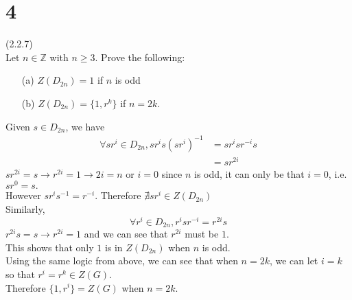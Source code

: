 \documentclass{article}
\begin{document}
\section*{4}
(2.2.7)\\
Let $n \in \mathbb{Z}$ with $n \geq 3$. Prove the following:
\begin{itemize}
    \item[(a)] $Z(D_{2n}) = 1$ if $n$ is odd
    \item[(b)] $Z(D_{2n}) = \{1, r^k\}$ if $n = 2k$.
\end{itemize}
\begin{addmargin}[1em]{0em}
    Given $s \in D_{2n}$, we have
    \begin{equation*}
        \begin{split}
            \forall sr^i \in D_{2n}, sr^is(sr^i)^{-1} & = sr^isr^{-i}s \\
            & = sr^{2i}
        \end{split}
    \end{equation*}
    $sr^{2i} = s \rightarrow r^{2i} = 1 \rightarrow 2i = n$ or $i = 0$ since $n$ is odd, it can only be that $i=0$, i.e. $sr^0 = s.$\\
    However $sr^is^{-1} = r^{-i}$. Therefore $\nexists sr^i \in Z(D_{2n})$\\
    Similarly,
    \begin{equation*}
            \forall r^i \in D_{2n}, r^isr^{-i} = r^{2i}s
    \end{equation*}
    $r^{2i}s = s \rightarrow r^{2i} = 1$ and we can see that $r^{2i}$ must be $1$.\\
    This shows that only $1$ is in $Z(D_{2n})$ when $n$ is odd.\\
    Using the same logic from above, we can see that when $n = 2k$, we can let $i = k$ so that $r^i = r^k \in Z(G)$.\\
    Therefore $\{1, r^i\} = Z(G)$ when $n = 2k$.
\end{addmargin}
\end{document}
